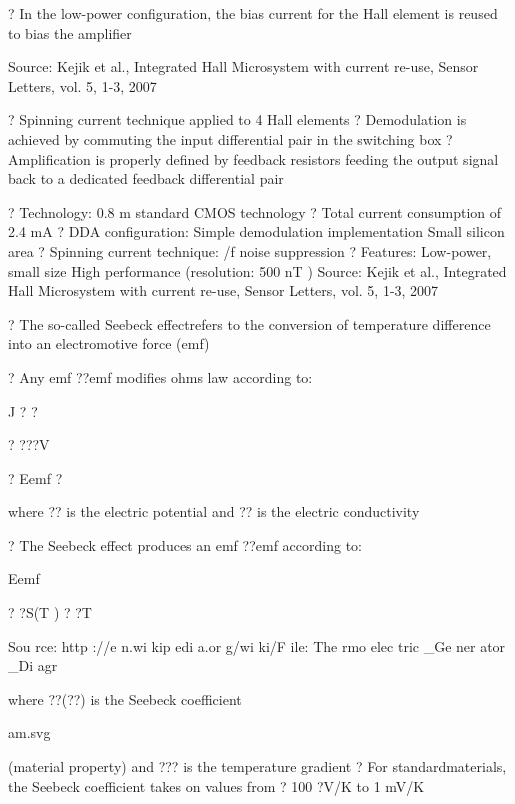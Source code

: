 \documentclass[2pt,landscape]{article}
\begin{document}
\begin{multicols*}{5}
?	In the low-power configuration, the bias current for the Hall element is reused 
to bias the amplifier





Source: Kejik et al., \textbullet Integrated Hall Microsystem with current re-use\textbullet , Sensor Letters, vol. 5, 1-3, 2007

?	Spinning current technique applied to 4 Hall elements
?	Demodulation is achieved by commuting the input differential pair in 
the switching box
?	Amplification is properly defined by feedback resistors feeding the 
output signal back to a dedicated feedback differential pair



?	Technology: 0.8 \textbullet m standard CMOS 
technology
?	Total current consumption of 2.4 mA
?	DDA configuration:
\textbullet 	Simple demodulation implementation
\textbullet 	Small silicon area
?	Spinning current technique:
/f noise suppression
?	Features:
\textbullet 	Low-power, small size
\textbullet 	High performance (resolution: 500 nT )
Source: Kejik et al., \textbullet Integrated Hall Microsystem with current re-use\textbullet , Sensor Letters, vol. 5, 1-3, 2007



?	The so-called \textbullet Seebeck effect\textbullet refers to the 
conversion of temperature difference into an 
electromotive force (emf)

?	Any emf ??emf modifies ohm\textbullet s law according to:


J ? ?


? ???V


?	Eemf ?


where ?? is the electric potential and ?? is 
the electric conductivity

?	The Seebeck effect produces an emf ??emf
according to:


Eemf


? ?S(T ) ? 
?T


Sou
rce: 
http
://e
n.wi
kip
edi
a.or
g/wi
ki/F
ile: 
The
rmo
elec
tric
\_Ge
ner
ator
\_Di
agr


where ??(??) is the Seebeck coefficient


am.svg


(material property) and ??? is the temperature gradient
?	For \textbullet standard\textbullet materials, the Seebeck coefficient takes on values from
? 100 ?V/K to 1 mV/K




\end{multicols*}
\end{document}
